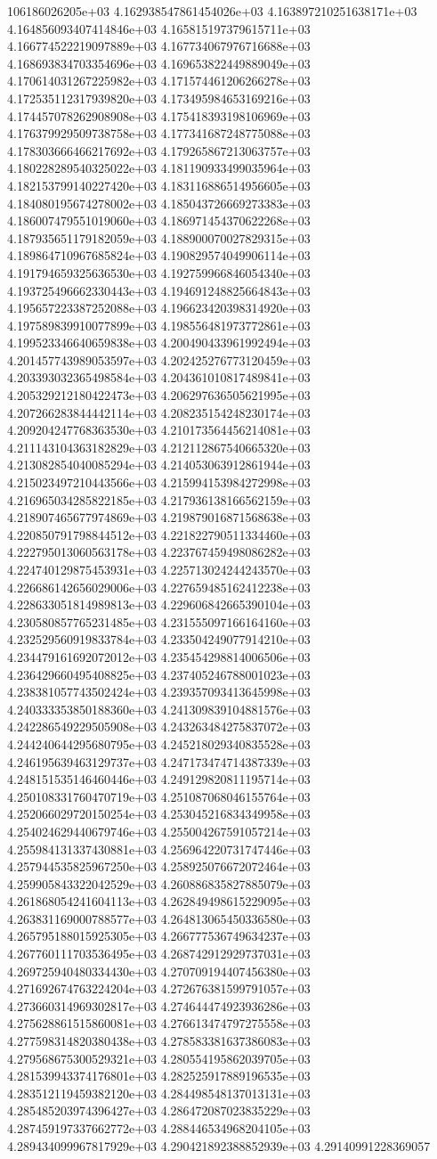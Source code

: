 106186026205e+03	4.162938547861454026e+03	4.163897210251638171e+03	4.164856093407414846e+03	4.165815197379615711e+03	4.166774522219097889e+03	4.167734067976716688e+03	4.168693834703354696e+03	4.169653822449889049e+03	4.170614031267225982e+03	4.171574461206266278e+03	4.172535112317939820e+03	4.173495984653169216e+03	4.174457078262908908e+03	4.175418393198106969e+03	4.176379929509738758e+03	4.177341687248775088e+03	4.178303666466217692e+03	4.179265867213063757e+03	4.180228289540325022e+03	4.181190933499035964e+03	4.182153799140227420e+03	4.183116886514956605e+03	4.184080195674278002e+03	4.185043726669273383e+03	4.186007479551019060e+03	4.186971454370622268e+03	4.187935651179182059e+03	4.188900070027829315e+03	4.189864710967685824e+03	4.190829574049906114e+03	4.191794659325636530e+03	4.192759966846054340e+03	4.193725496662330443e+03	4.194691248825664843e+03	4.195657223387252088e+03	4.196623420398314920e+03	4.197589839910077899e+03	4.198556481973772861e+03	4.199523346640659838e+03	4.200490433961992494e+03	4.201457743989053597e+03	4.202425276773120459e+03	4.203393032365498584e+03	4.204361010817489841e+03	4.205329212180422473e+03	4.206297636505621995e+03	4.207266283844442114e+03	4.208235154248230174e+03	4.209204247768363530e+03	4.210173564456214081e+03	4.211143104363182829e+03	4.212112867540665320e+03	4.213082854040085294e+03	4.214053063912861944e+03	4.215023497210443566e+03	4.215994153984272998e+03	4.216965034285822185e+03	4.217936138166562159e+03	4.218907465677974869e+03	4.219879016871568638e+03	4.220850791798844512e+03	4.221822790511334460e+03	4.222795013060563178e+03	4.223767459498086282e+03	4.224740129875453931e+03	4.225713024244243570e+03	4.226686142656029006e+03	4.227659485162412238e+03	4.228633051814989813e+03	4.229606842665390104e+03	4.230580857765231485e+03	4.231555097166164160e+03	4.232529560919833784e+03	4.233504249077914210e+03	4.234479161692072012e+03	4.235454298814006506e+03	4.236429660495408825e+03	4.237405246788001023e+03	4.238381057743502424e+03	4.239357093413645998e+03	4.240333353850188360e+03	4.241309839104881576e+03	4.242286549229505908e+03	4.243263484275837072e+03	4.244240644295680795e+03	4.245218029340835528e+03	4.246195639463129737e+03	4.247173474714387339e+03	4.248151535146460446e+03	4.249129820811195714e+03	4.250108331760470719e+03	4.251087068046155764e+03	4.252066029720150254e+03	4.253045216834349958e+03	4.254024629440679746e+03	4.255004267591057214e+03	4.255984131337430881e+03	4.256964220731747446e+03	4.257944535825967250e+03	4.258925076672072464e+03	4.259905843322042529e+03	4.260886835827885079e+03	4.261868054241604113e+03	4.262849498615229095e+03	4.263831169000788577e+03	4.264813065450336580e+03	4.265795188015925305e+03	4.266777536749634237e+03	4.267760111703536495e+03	4.268742912929737031e+03	4.269725940480334430e+03	4.270709194407456380e+03	4.271692674763224204e+03	4.272676381599791057e+03	4.273660314969302817e+03	4.274644474923936286e+03	4.275628861515860081e+03	4.276613474797275558e+03	4.277598314820380438e+03	4.278583381637386083e+03	4.279568675300529321e+03	4.280554195862039705e+03	4.281539943374176801e+03	4.282525917889196535e+03	4.283512119459382120e+03	4.284498548137013131e+03	4.285485203974396427e+03	4.286472087023835229e+03	4.287459197337662772e+03	4.288446534968204105e+03	4.289434099967817929e+03	4.290421892388852939e+03	4.29140991228369057